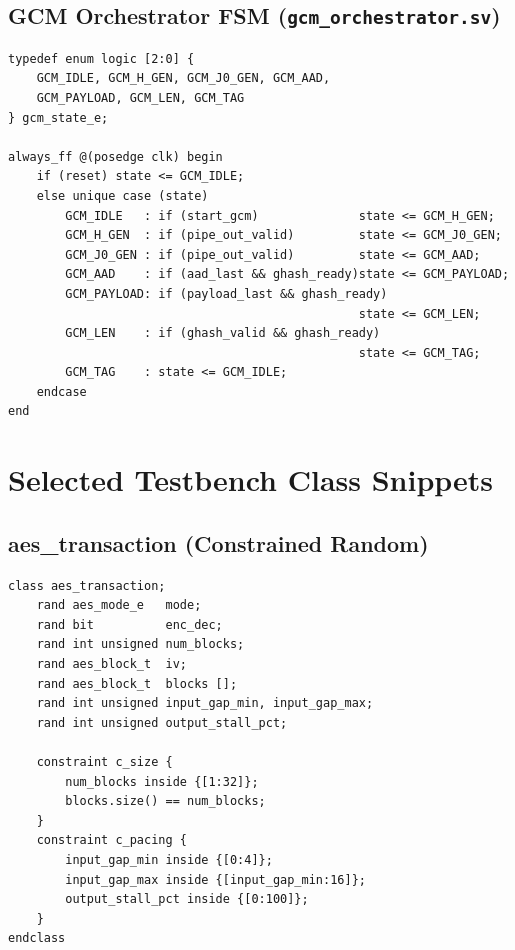 \documentclass[conference,10pt,a4paper]{IEEEtran}
\begin{document}
\subsection{GCM Orchestrator FSM (\texttt{gcm\_orchestrator.sv})}
\begin{lstlisting}
typedef enum logic [2:0] {
    GCM_IDLE, GCM_H_GEN, GCM_J0_GEN, GCM_AAD,
    GCM_PAYLOAD, GCM_LEN, GCM_TAG
} gcm_state_e;

always_ff @(posedge clk) begin
    if (reset) state <= GCM_IDLE;
    else unique case (state)
        GCM_IDLE   : if (start_gcm)              state <= GCM_H_GEN;
        GCM_H_GEN  : if (pipe_out_valid)         state <= GCM_J0_GEN;
        GCM_J0_GEN : if (pipe_out_valid)         state <= GCM_AAD;
        GCM_AAD    : if (aad_last && ghash_ready)state <= GCM_PAYLOAD;
        GCM_PAYLOAD: if (payload_last && ghash_ready)
                                                 state <= GCM_LEN;
        GCM_LEN    : if (ghash_valid && ghash_ready)
                                                 state <= GCM_TAG;
        GCM_TAG    : state <= GCM_IDLE;
    endcase
end
\end{lstlisting}

\section{Selected Testbench Class Snippets}
\label{app:tb}

\subsection{aes\_transaction (Constrained Random)}
\begin{lstlisting}
class aes_transaction;
    rand aes_mode_e   mode;
    rand bit          enc_dec;
    rand int unsigned num_blocks;
    rand aes_block_t  iv;
    rand aes_block_t  blocks [];
    rand int unsigned input_gap_min, input_gap_max;
    rand int unsigned output_stall_pct;

    constraint c_size {
        num_blocks inside {[1:32]};
        blocks.size() == num_blocks;
    }
    constraint c_pacing {
        input_gap_min inside {[0:4]};
        input_gap_max inside {[input_gap_min:16]};
        output_stall_pct inside {[0:100]};
    }
endclass
\end{lstlisting}
\end{document}
